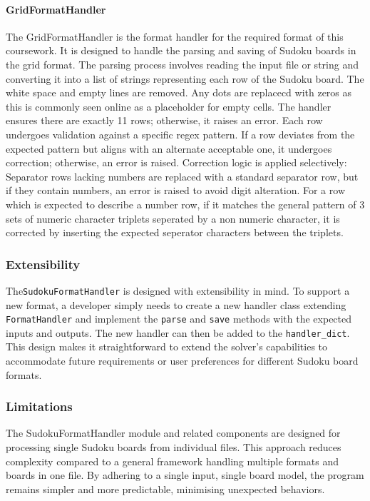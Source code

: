 \documentclass[11pt]{article}
\begin{document}
\paragraph{GridFormatHandler}
The GridFormatHandler is the format handler for the required format of this coursework. It is designed to handle the parsing and saving of Sudoku boards in the grid format. The parsing process involves reading the input file or string and converting it into a list of strings representing each row of the Sudoku board. The white space and empty lines are removed. Any dots are replacecd with zeros as this is commonly seen online as a placeholder for empty cells. The handler ensures there are exactly 11 rows; otherwise, it raises an error. Each row undergoes validation against a specific regex pattern. If a row deviates from the expected pattern but aligns with an alternate acceptable one, it undergoes correction; otherwise, an error is raised. Correction logic is applied selectively: Separator rows lacking numbers are replaced with a standard separator row, but if they contain numbers, an error is raised to avoid digit alteration. For a row which is expected to describe a number row, if it matches the general pattern of 3 sets of numeric character triplets seperated by a non numeric character, it is corrected by inserting the expected seperator characters between the triplets.

\subsubsection{Extensibility}
The\texttt{SudokuFormatHandler} is designed with extensibility in mind. To support a new format, a developer simply needs to create a new handler class extending \texttt{FormatHandler} and implement the \texttt{parse} and \texttt{save} methods with the expected inputs and outputs. The new handler can then be added to the \texttt{handler\_dict}. This design makes it straightforward to extend the solver's capabilities to accommodate future requirements or user preferences for different Sudoku board formats.


\subsubsection{Limitations}
The SudokuFormatHandler module and related components are designed for processing single Sudoku boards from individual files. This approach reduces complexity compared to a general framework handling multiple formats and boards in one file. By adhering to a single input, single board model, the program remains simpler and more predictable, minimising unexpected behaviors.
\end{document}
